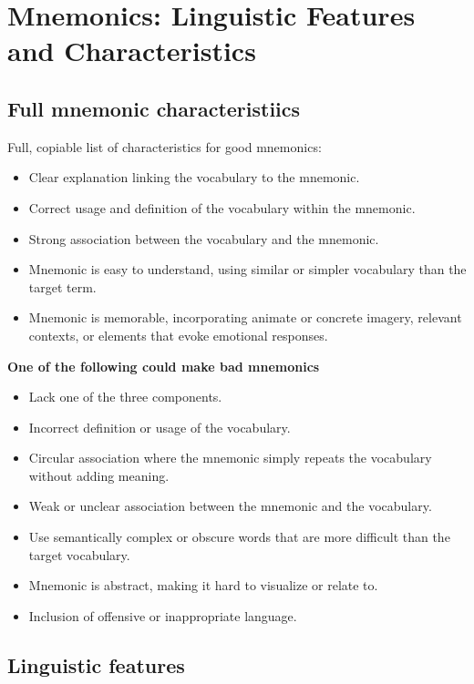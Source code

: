 \section{Mnemonics: Linguistic Features and Characteristics} \label{app:mnemonics}


\subsection{Full mnemonic characteristiics} \label{app:mnemonic-characteristics}

Full, copiable list of characteristics for good mnemonics:
\begin{itemize}
  \item Clear explanation linking the vocabulary to the mnemonic.
  \item Correct usage and definition of the vocabulary within the mnemonic.
  \item Strong association between the vocabulary and the mnemonic.
  \item Mnemonic is easy to understand, using similar or simpler vocabulary than the target term.
  \item Mnemonic is memorable, incorporating animate or concrete imagery, relevant contexts, or elements that evoke emotional responses.
\end{itemize}

\textbf{One of the following could make bad mnemonics}
\begin{itemize}
  \item Lack one of the three components.
  \item Incorrect definition or usage of the vocabulary.
  \item Circular association where the mnemonic simply repeats the vocabulary without adding meaning.
  \item Weak or unclear association between the mnemonic and the vocabulary.
  \item Use semantically complex or obscure words that are more difficult than the target vocabulary.
  \item Mnemonic is abstract, making it hard to visualize or relate to.
  \item Inclusion of offensive or inappropriate language.
\end{itemize}

\subsection{Linguistic features} \label{sec:linguistic-features}

